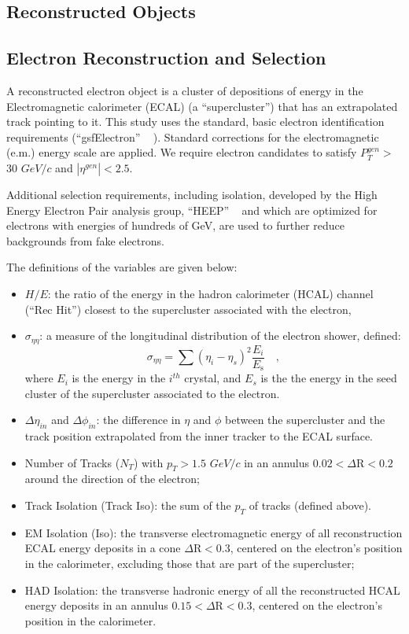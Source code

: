 \documentclass{cmspaper}
\begin{document}
\begin{linenumbers}
\section{Reconstructed Objects} 

\subsection{Electron Reconstruction and Selection} \label{sec:electrons}
A reconstructed electron object is a cluster of depositions 
of energy in the Electromagnetic calorimeter (ECAL) (a ``supercluster'') that has an 
extrapolated track pointing to it. This study uses the standard, basic electron
identification requirements (``gsfElectron'' ~\cite{GSFele}
).
Standard corrections  for
the electromagnetic (e.m.) energy scale are applied.
We require electron candidates to satisfy $P_{T}^{gen}>$ 30 $GeV/c$ 
and $|\eta^{gen}|<2.5$. 

Additional selection requirements, including isolation,
developed by the High Energy Electron Pair
 analysis group, ``HEEP'' ~\cite{HEEPNOTE} 
and which are optimized for 
electrons with energies of hundreds of GeV,
are used to further reduce backgrounds
from fake electrons.

The definitions of the variables are given below:
%
\begin{itemize}
%
\item $H/E$: the ratio of the energy in the hadron calorimeter (HCAL)
channel (``Rec Hit'') closest 
 to the supercluster associated with the electron,
%
\item $\sigma_{\eta\eta}$: a measure of 
the longitudinal distribution of the electron shower, defined:
\begin{displaymath}
\sigma_{\eta\eta} = \sum( \eta_i - \eta_s )^2 \frac{E_i}{E_{\mbox{s}}} \quad ,
\end{displaymath}
where $E_i$ is the energy in the $i^{th}$ crystal, and $E_s$ is the the energy in the seed cluster of the supercluster associated to the electron.
%
\item $\Delta\eta_{in}$ and $\Delta\phi_{in}$: the difference in $\eta$ and $\phi$ between the supercluster and the track position extrapolated from 
the inner tracker to the ECAL surface.
%
\item Number of Tracks ($N_T$) with $p_{T}>1.5$ $GeV/c$ in an annulus $0.02 < \Delta\mbox{R} < 0.2 $ around the direction of the electron;
%
\item Track Isolation (Track Iso): the sum of the $p_{T}$ of tracks (defined above).
%
%
\item EM Isolation (Iso): the transverse electromagnetic energy 
of all reconstruction ECAL energy deposits
in a cone $\Delta\mbox{R} < 0.3$, 
centered on the electron's position in the calorimeter, excluding those
that are part of the supercluster;
%
\item HAD Isolation: the transverse  hadronic energy of all the 
reconstructed HCAL energy deposits in an annulus
$0.15 < \Delta\mbox{R} < 0.3$, centered on the electron's position in the calorimeter. 
%
\end{itemize}


\end{linenumbers}
\end{document}
